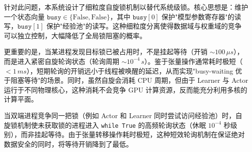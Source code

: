 针对此问题，本系统设计了细粒度自旋锁机制以替代系统级锁。核心思想是：维护一个状态向量 $\texttt{busy} \in \{\text{False}, \text{False}\}$，其中 $\texttt{busy}[0]$ 保护"模型参数寄存器"的读写，$\texttt{busy}[1]$ 保护"经验池"的读写。这种细粒度分离使得数据域与权重域的竞争可以独立控制，大幅降低了全局锁阻塞的概率。

更重要的是，当某进程发现目标锁已被占用时，不是挂起等待（开销 $\sim 100\,\mu s$），而是进入紧密自旋轮询状态（轮询周期 $\sim 10^{-4}\,s$）。鉴于张量操作通常耗时极短（$< 1\,ms$），短期轮询的开销远小于线程被唤醒的延迟，从而实现"busy-waiting 优于阻塞等待"的场景。同时，虽然自旋会消耗 CPU 周期，但由于 Learner 与 Actor 运行于不同物理核心，这种消耗不会竞争 GPU 计算资源，反而能充分利用多核的计算平面。

当双端进程竞争同一把锁（例如 Actor 和 Learner 同时尝试访问经验池）时，自旋锁机制使未获取锁的进程进入 \texttt{while True} 的高频轮询状态（休眠 $10^{-4}$ 秒级别），而非挂起等待。由于张量转移操作耗时极短，这种短效轮询机制在保证绝对数据安全的同时，将等待开销降到了最低。

